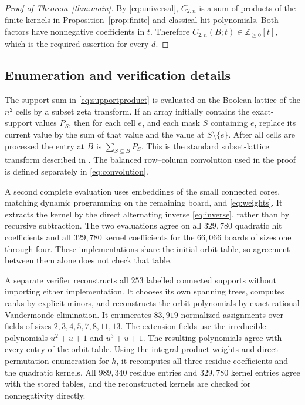 \documentclass[11pt]{article}
\newcommand{\NN}{\mathbb Z_{\geq0}}
\begin{document}
\begin{proof}[Proof of Theorem~\ref{thm:main}]
By \eqref{eq:universal}, $C_{2,n}$ is a sum of products of the finite
kernels in Proposition~\ref{prop:finite} and classical hit polynomials.
Both factors have nonnegative coefficients in $t$. Therefore
$C_{2,n}(B;t)\in\NN[t]$, which is the required assertion for every $d$.
\end{proof}

\subsection*{Enumeration and verification details}

The support sum in \eqref{eq:supportproduct} is evaluated on the Boolean
lattice of the $n^2$ cells by a subset zeta transform. If an array
initially contains the exact-support values $P_S$, then for each cell
$e$, and each mask $S$ containing $e$, replace its current value by the
sum of that value and the value at $S\setminus\{e\}$. After all cells
are processed the entry at $B$ is $\sum_{S\subseteq B}P_S$.
This is the standard subset-lattice transform described in
\cite[Section~2.2]{BjorklundEtAl2006}. The balanced row--column
convolution used in the proof is defined separately in
\eqref{eq:convolution}.

A second complete evaluation uses embeddings of the small connected
cores, matching dynamic programming on the remaining board, and
\eqref{eq:weights}. It extracts the kernel by the direct alternating
inverse \eqref{eq:inverse}, rather than by recursive subtraction.
The two evaluations agree on all $329{,}780$ quadratic hit coefficients
and all $329{,}780$ kernel coefficients for the $66{,}066$ boards of
sizes one through four. These implementations share the initial orbit
table, so agreement between them alone does not check that table.

A separate verifier reconstructs all $253$ labelled connected supports
without importing either implementation. It chooses its own spanning
trees, computes ranks by explicit minors, and reconstructs the orbit
polynomials by exact rational Vandermonde elimination. It enumerates
$83{,}919$ normalized assignments over fields of sizes
$2,3,4,5,7,8,11,13$. The extension fields use the irreducible polynomials
$u^2+u+1$ and $u^3+u+1$. The resulting polynomials agree with every
entry of the orbit table. Using the integral product weights and
direct permutation enumeration for $h$, it recomputes all three
residue coefficients and the quadratic kernels. All $989{,}340$
residue entries and $329{,}780$ kernel entries agree with the stored
tables, and the reconstructed kernels are checked for nonnegativity
directly.
\end{document}
